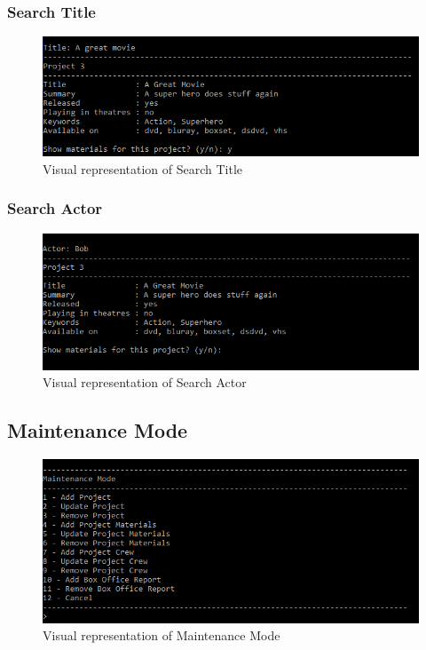 \documentclass[
  english,
  a4paper,
,tablecaptionabove
]{scrartcl}
\begin{document}
\newpage

\hypertarget{search-title}{%
\subsubsection{Search Title}\label{search-title}}

\begin{figure}
\centering
\includegraphics{images/ui-screenshots/search-title.png}
\caption{Visual representation of Search Title}
\end{figure}

\newpage

\hypertarget{search-actor}{%
\subsubsection{Search Actor}\label{search-actor}}

\begin{figure}
\centering
\includegraphics{images/ui-screenshots/search-actor.png}
\caption{Visual representation of Search Actor}
\end{figure}

\newpage

\hypertarget{maintenance-mode}{%
\subsection{Maintenance Mode}\label{maintenance-mode}}

\begin{figure}
\centering
\includegraphics{images/ui-screenshots/maintenance-mode.png}
\caption{Visual representation of Maintenance Mode}
\end{figure}
\end{document}
